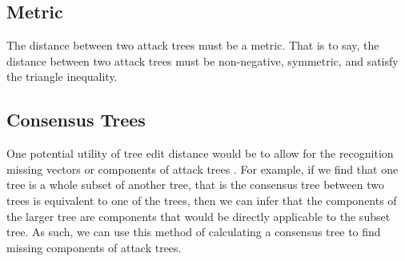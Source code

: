 \subsection{Metric}
\label{ssec:metric}

The distance between two attack trees must be a metric. That is to say, the distance between two attack trees must be non-negative, symmetric, and satisfy the triangle inequality.



\subsection{Consensus Trees}
\label{ssec:consensus-trees}

One potential utility of tree edit distance would be to allow for the recognition missing vectors or components of attack trees . For example, if we find that one tree is a whole subset of another tree, that is the consensus tree between two trees is equivalent to one of the trees, then we can infer that the components of the larger tree are components that would be directly applicable to the subset tree. As such, we can use this method of calculating a consensus tree to find missing components of attack trees.